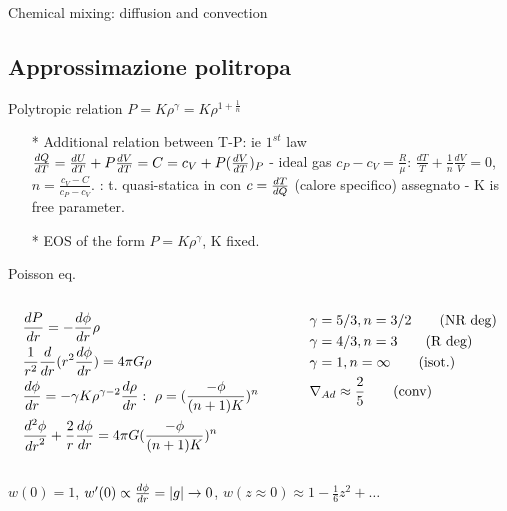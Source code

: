 \begin{frame}{Chemical mixing: diffusion and convection}

\end{frame}

\subsection{Approssimazione politropa}

\begin{frame}{Polytropic relation $P=K\rho^{\gamma}=K\rho^{1+\frac{1}{n}}$}
	\begin{itemize}
\item[*] Additional relation between T-P: ie $1^{st}$ law $\TDy{T}{Q}=\TDy{T}{U}+P\TDy{T}{V}=C=c_V+P(\TDy{T}{V})_P$ - ideal gas $c_P-c_V=\frac{R}{\mu}$: $\frac{dT}{T}+\frac{1}{n}\frac{dV}{V}=0$, $n=\frac{c_V-C}{c_P-c_V}$. : t. quasi-statica in  con $c=\TDy{Q}{T}$ (calore specifico) assegnato - K is free parameter.
\item [*] EOS of the form $P=K\rho^{\gamma}$, K fixed.
    \end{itemize}
	\begin{block}{Poisson eq.}
		\begin{columns}[T]
			\begin{column}{0.6\textwidth}
				\begin{align*}
				&\TDy{r}{P}=-\TDy{r}{\phi}\rho\\
				&\frac{1}{r^2}\TDof{r}(r^2\TDy{r}{\phi})=4\pi G\rho\\
				&\TDy{r}{\phi}=-\gamma K\rho\expy{\gamma-2}\TDy{r}{\rho}:\ \rho=(\frac{-\phi}{(n+1)K})^n\\
				&\TtwoDy{r}{\phi}+\frac{2}{r}\TDy{r}{\phi}=4\pi G(\frac{-\phi}{(n+1)K})^n
				\end{align*}
			\end{column}
			\begin{column}{0.4\textwidth}
				\begin{align*}
				&\gamma=5/3, n=3/2\tag{NR deg}\\
				&\gamma=4/3, n=3\tag{R deg}\\
				&\gamma=1, n=\infty\tag{isot.}\\
				&\nad\approx\frac{2}{5}\tag{conv}
				\end{align*}
		\end{column}\end{columns}
	\end{block}
$w(0)=1$, $w'(0)\propto\TDy{r}{\phi}=|g|\to0$, $w(z\approx0)\approx1-\frac{1}{6}z^2+\ldots$
\end{frame}

